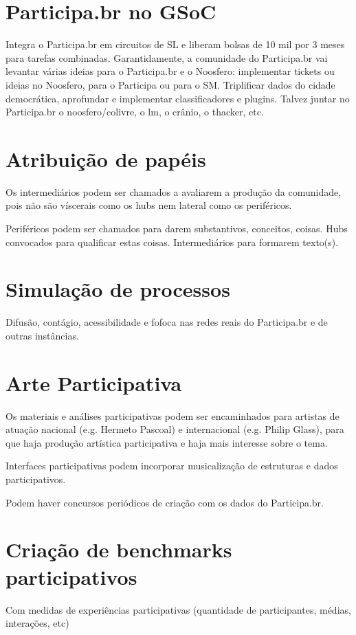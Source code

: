 \documentclass[12pt]{report}
\begin{document}
\chapter{Participa.br no GSoC}
Integra o Participa.br em circuitos de SL e liberam bolsas de 10 mil por 3 meses para tarefas combinadas. Garantidamente, a comunidade do Participa.br vai levantar várias ideias para o Participa.br e o Noosfero: implementar tickets ou ideias no Noosfero, para o Participa ou para o SM. Triplificar dados do cidade democrática, aprofundar e implementar classificadores e plugins. Talvez juntar no Participa.br o noosfero/colivre, o lm, o crânio, o thacker, etc.

\chapter{Atribuição de papéis}
Os intermediários podem ser chamados a avaliarem a produção da comunidade, pois não são víscerais como os hubs nem lateral como os periféricos.

Periféricos podem ser chamados para darem substantivos, conceitos, coisas.
Hubs convocados para qualificar estas coisas. Intermediários para formarem texto(s).
\chapter{Simulação de processos}

Difusão, contágio, acessibilidade e fofoca nas redes reais do Participa.br e de outras instâncias.

\chapter{Arte Participativa}
Os materiais e análises participativas podem ser encaminhados para artistas de atuação nacional (e.g. Hermeto Pascoal) e internacional (e.g. Philip Glass), para que haja produção artística participativa e haja mais interesse sobre o tema.

Interfaces participativas podem incorporar musicalização de estruturas e dados participativos.

Podem haver concursos periódicos de criação com os dados do Participa.br.
\chapter{Criação de benchmarks participativos}
Com medidas de experiências participativas (quantidade de participantes, médias, interações, etc)
\end{document}
